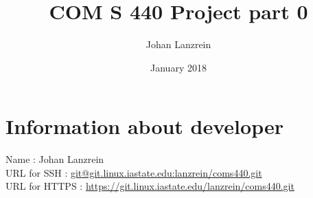 \documentclass{article}
\title{COM S 440 Project part 0}
\author{Johan Lanzrein}
\date{January 2018}
\begin{document}
\maketitle

\section{Information about developer}

Name : Johan Lanzrein \\
URL for SSH : \url{git@git.linux.iastate.edu:lanzrein/coms440.git} \\
URL for HTTPS : \url{https://git.linux.iastate.edu/lanzrein/coms440.git}
\end{document}

